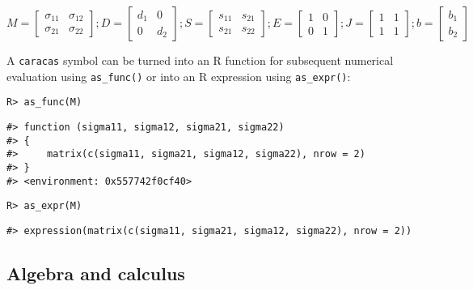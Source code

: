 \begin{equation}
M = \left[\begin{matrix}\sigma_{11} & \sigma_{12}\\\sigma_{21} & \sigma_{22}\end{matrix}\right];
D = \left[\begin{matrix}d_{1} & 0\\0 & d_{2}\end{matrix}\right];
S = \left[\begin{matrix}s_{11} & s_{21}\\s_{21} & s_{22}\end{matrix}\right];
E = \left[\begin{matrix}1 & 0\\0 & 1\end{matrix}\right];
J = \left[\begin{matrix}1 & 1\\1 & 1\end{matrix}\right];
b = \left[\begin{matrix}b_{1}\\b_{2}\end{matrix}\right]
\end{equation}

A \texttt{caracas} symbol can be turned into an R function for subsequent
numerical evaluation using \texttt{as\_func()} or into an R expression using \texttt{as\_expr()}:

\begin{verbatim}
R> as_func(M)
\end{verbatim}

\begin{verbatim}
#> function (sigma11, sigma12, sigma21, sigma22) 
#> {
#>     matrix(c(sigma11, sigma21, sigma12, sigma22), nrow = 2)
#> }
#> <environment: 0x557742f0cf40>
\end{verbatim}

\begin{verbatim}
R> as_expr(M)
\end{verbatim}

\begin{verbatim}
#> expression(matrix(c(sigma11, sigma21, sigma12, sigma22), nrow = 2))
\end{verbatim}

\hypertarget{algebra-and-calculus}{%
\subsection{Algebra and calculus}\label{algebra-and-calculus}}


